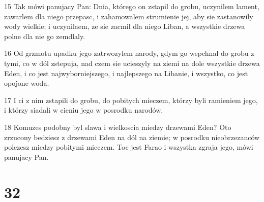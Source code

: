 \par 15 Tak mówi panujacy Pan: Dnia, którego on zstapil do grobu, uczynilem lament, zawarlem dla niego przepasc, i zahamowalem strumienie jej, aby sie zastanowily wody wielkie; i uczynilaem, ze sie zacmil dla niego Liban, a wszystkie drzewa polne dla nie go zemdlaly.
\par 16 Od grzmotu upadku jego zatrwozylem narody, gdym go wepchnal do grobu z tymi, co w dól zstepuja, nad czem sie ucieszyly na ziemi na dole wszystkie drzewa Eden, i co jest najwyborniejszego, i najlepszego na Libanie, i wszystko, co jest opojone woda.
\par 17 I ci z nim zstapili do grobu, do pobitych mieczem, którzy byli ramieniem jego, i którzy siadali w cieniu jego w posrodku narodów.
\par 18 Komuzes podobny byl slawa i wielkoscia miedzy drzewami Eden? Oto zrzucony bedziesz z drzewami Eden na dól na ziemie; w posrodku nieobrzezanców polezesz miedzy pobitymi mieczem. Toc jest Farao i wszystka zgraja jego, mówi panujacy Pan.

\chapter{32}

